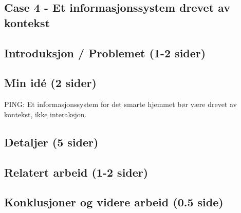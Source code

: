 \subsection{Case 4 - Et informasjonssystem drevet av kontekst}
\subsection*{Introduksjon / Problemet (1-2 sider)}

\subsection*{Min idé (2 sider)}
{\color{red}PING: Et informasjonssystem for det smarte hjemmet bør være drevet av kontekst, ikke interaksjon.}

\subsection*{Detaljer (5 sider)}

\subsection*{Relatert arbeid (1-2 sider)}

\subsection*{Konklusjoner og videre arbeid (0.5 side)}
